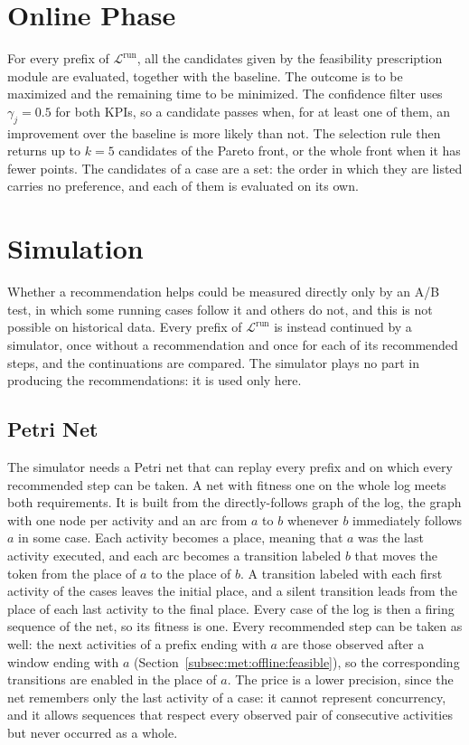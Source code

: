 \section{Online Phase}
\label{sec:ev:online}
For every prefix of $\mathcal{L}^{\mathrm{run}}$, all the candidates given
by the feasibility prescription module are evaluated, together with the
baseline. The outcome is to be maximized and the remaining time to be
minimized. The confidence filter uses $\gamma_j = 0.5$ for both KPIs, so a
candidate passes when, for at least one of them, an improvement over the
baseline is more likely than not. The selection rule then returns up to
$k = 5$ candidates of the Pareto front, or the whole front when it has fewer
points. The candidates of a case are a set: the order in which they are
listed carries no preference, and each of them is evaluated on its own.


\section{Simulation}
\label{sec:ev:sim}
Whether a recommendation helps could be measured directly only by an A/B
test, in which some running cases follow it and others do not, and this is
not possible on historical data. Every prefix of $\mathcal{L}^{\mathrm{run}}$
is instead continued by a simulator, once without a recommendation and once
for each of its recommended steps, and the continuations are compared. The
simulator plays no part in producing the recommendations: it is used only
here.

\subsection{Petri Net}
\label{subsec:ev:sim:net}
The simulator needs a Petri net that can replay every prefix and on which
every recommended step can be taken. A net with fitness one on the whole log
meets both requirements. It is built from the directly-follows graph of the
log, the graph with one node per activity and an arc from $a$ to $b$
whenever $b$ immediately follows $a$ in some case. Each activity becomes a
place, meaning that $a$ was the last activity executed, and each arc
becomes a transition labeled $b$ that moves the token from the place of $a$
to the place of $b$. A transition labeled with each first activity of the
cases leaves the initial place, and a silent transition leads from the place
of each last activity to the final place. Every case of the log is then a firing sequence of the net, so its
fitness is one. Every recommended step can be taken as well: the next
activities of a prefix ending with $a$ are those observed after a window
ending with $a$ (Section~\ref{subsec:met:offline:feasible}), so the
corresponding transitions are enabled in the place of $a$. The price is a
lower precision, since the net remembers only the last activity of a case:
it cannot represent concurrency, and it allows sequences that respect every
observed pair of consecutive activities but never occurred as a whole.

